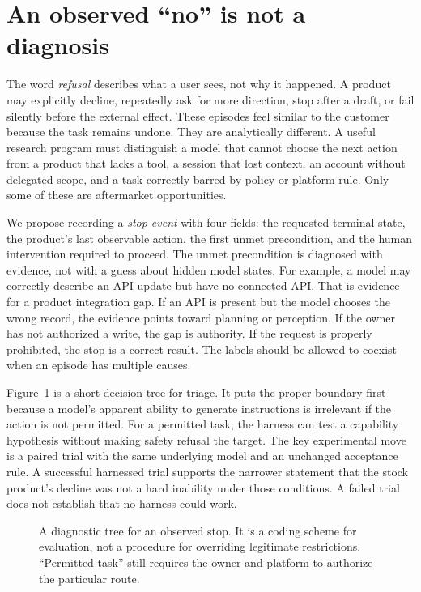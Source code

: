 \section{An observed ``no'' is not a diagnosis}

The word \emph{refusal} describes what a user sees, not why it happened. A product may explicitly decline, repeatedly ask for more direction, stop after a draft, or fail silently before the external effect. These episodes feel similar to the customer because the task remains undone. They are analytically different. A useful research program must distinguish a model that cannot choose the next action from a product that lacks a tool, a session that lost context, an account without delegated scope, and a task correctly barred by policy or platform rule. Only some of these are aftermarket opportunities.

We propose recording a \emph{stop event} with four fields: the requested terminal state, the product's last observable action, the first unmet precondition, and the human intervention required to proceed. The unmet precondition is diagnosed with evidence, not with a guess about hidden model states. For example, a model may correctly describe an API update but have no connected API. That is evidence for a product integration gap. If an API is present but the model chooses the wrong record, the evidence points toward planning or perception. If the owner has not authorized a write, the gap is authority. If the request is properly prohibited, the stop is a correct result. The labels should be allowed to coexist when an episode has multiple causes.

Figure~\ref{fig:refusal} is a short decision tree for triage. It puts the proper boundary first because a model's apparent ability to generate instructions is irrelevant if the action is not permitted. For a permitted task, the harness can test a capability hypothesis without making safety refusal the target. The key experimental move is a paired trial with the same underlying model and an unchanged acceptance rule. A successful harnessed trial supports the narrower statement that the stock product's decline was not a hard inability under those conditions. A failed trial does not establish that no harness could work.

\begin{figure}[tbp]
\centering
\caption{A diagnostic tree for an observed stop. It is a coding scheme for evaluation, not a procedure for overriding legitimate restrictions. ``Permitted task'' still requires the owner and platform to authorize the particular route.}
\label{fig:refusal}
\end{figure}

